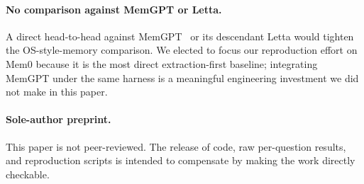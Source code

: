 \paragraph{No comparison against MemGPT or Letta.} A direct head-to-head against MemGPT~\citep{memgpt} or its descendant Letta would tighten the OS-style-memory comparison. We elected to focus our reproduction effort on Mem0 because it is the most direct extraction-first baseline; integrating MemGPT under the same harness is a meaningful engineering investment we did not make in this paper.

\paragraph{Sole-author preprint.} This paper is not peer-reviewed. The release of code, raw per-question results, and reproduction scripts is intended to compensate by making the work directly checkable.
